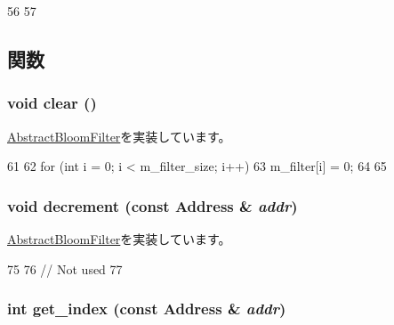 \begin{DoxyCode}
56 {
57 }
\end{DoxyCode}


\subsection{関数}
\hypertarget{classBlockBloomFilter_ac8bb3912a3ce86b15842e79d0b421204}{
\subsubsection[{clear}]{\setlength{\rightskip}{0pt plus 5cm}void clear ()}}
\label{classBlockBloomFilter_ac8bb3912a3ce86b15842e79d0b421204}


\hyperlink{classAbstractBloomFilter_a5eeb94d22b8366d1b68d0614384802fe}{AbstractBloomFilter}を実装しています。


\begin{DoxyCode}
61 {
62     for (int i = 0; i < m_filter_size; i++) {
63         m_filter[i] = 0;
64     }
65 }
\end{DoxyCode}
\hypertarget{classBlockBloomFilter_addb6b805abb8328082a24926f2bf8c84}{
\subsubsection[{decrement}]{\setlength{\rightskip}{0pt plus 5cm}void decrement (const {\bf Address} \& {\em addr})}}
\label{classBlockBloomFilter_addb6b805abb8328082a24926f2bf8c84}


\hyperlink{classAbstractBloomFilter_aa387151f4ab03c6cd497d4385e34c21a}{AbstractBloomFilter}を実装しています。


\begin{DoxyCode}
75 {
76     // Not used
77 }
\end{DoxyCode}
\hypertarget{classBlockBloomFilter_a0a9fd2f2f75033080fc27830f7c0fe64}{
\subsubsection[{get\_\-index}]{\setlength{\rightskip}{0pt plus 5cm}int get\_\-index (const {\bf Address} \& {\em addr})}}
\label{classBlockBloomFilter_a0a9fd2f2f75033080fc27830f7c0fe64}




